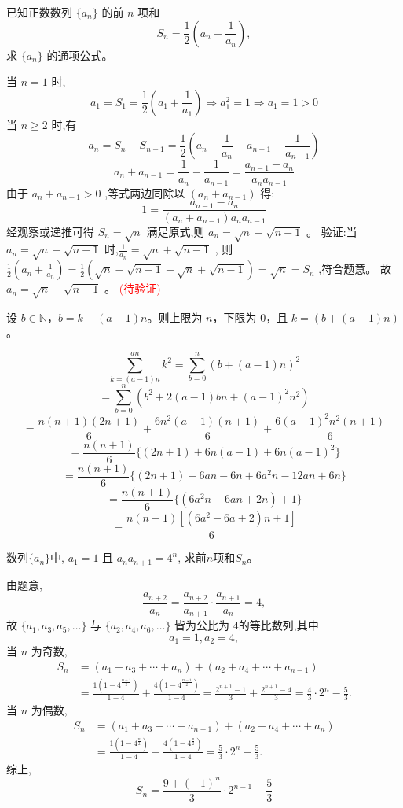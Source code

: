 \begin{questions}
\question 已知正数数列 $\{a_n\}$ 的前 $n$ 项和 
\[
S_n = \frac{1}{2} \left(a_n + \frac{1}{a_n}\right) ,
\]
求 $\{a_n\}$ 的通项公式。
\begin{solution}
当 $n=1$ 时,
\[
a_1 = S_1 = \frac{1}{2}\left(a_1 + \frac{1}{a_1}\right) \Rightarrow a_1^2 = 1 \Rightarrow a_1 = 1 >0
\]
当 $n \ge 2$ 时,有
\[ 
a_n = S_n - S_{n-1} = \frac{1}{2}\left(a_n + \frac{1}{a_n} - a_{n-1} - \frac{1}{a_{n-1}}\right) 
\]
\[ a_n + a_{n-1} = \frac{1}{a_n} - \frac{1}{a_{n-1}} = \frac{a_{n-1} - a_n}{a_n a_{n-1}} \]
由于 $a_n + a_{n-1} > 0$ ,等式两边同除以 $(a_n + a_{n-1})$ 得:
\[ 1 = \frac{a_{n-1} - a_n}{(a_n + a_{n-1}) a_n a_{n-1}} \]
经观察或递推可得 $S_n = \sqrt{n}$ 满足原式,则 $a_n = \sqrt{n} - \sqrt{n-1}$ 。
验证:当 $a_n = \sqrt{n} - \sqrt{n-1}$ 时,$\frac{1}{a_n} = \sqrt{n} + \sqrt{n-1}$ ,
则 $\frac{1}{2}(a_n + \frac{1}{a_n}) = \frac{1}{2}(\sqrt{n} - \sqrt{n-1} + \sqrt{n} + \sqrt{n-1}) = \sqrt{n} = S_n$ ,符合题意。
故 $a_n = \sqrt{n} - \sqrt{n-1}$ 。
\textcolor{red}{(待验证)}
\end{solution}

\question
设 $b \in \mathbb{N}$，$b = k - (a - 1)n$。则上限为 $n$，下限为 $0$，且 $k = (b + (a - 1)n)$。
\begin{solution}
\[ \sum_{k=(a-1)n}^{an} k^2 = \sum_{b=0}^{n} (b + (a - 1)n)^2 \]
\[ = \sum_{b=0}^{n} (b^2 + 2(a - 1)bn + (a - 1)^2 n^2) \]
\[ = \frac{n(n + 1)(2n + 1)}{6} + \frac{6n^2(a - 1)(n + 1)}{6} + \frac{6(a - 1)^2 n^2 (n + 1)}{6} \]
\[ = \frac{n(n + 1)}{6} \{ (2n + 1) + 6n(a - 1) + 6n(a - 1)^2 \} \]
\[ = \frac{n(n + 1)}{6} \{ (2n + 1) + 6an - 6n + 6a^2 n - 12an + 6n \} \]
\[ = \frac{n(n + 1)}{6} \{ (6a^2 n - 6an + 2n) + 1 \} \]
\[ = \frac{n(n + 1) [(6a^2 - 6a + 2)n + 1]}{6} \]
\end{solution}

    \question 数列$\{a_n\}$中, $a_1=1$ 且 $a_n a_{n+1}=4^n$, 求前$n$项和$S_n$。
    \begin{solution}
        由题意,
        \[
        \frac{a_{n+2}}{a_n} = \frac{a_{n+2}}{a_{n+1}} \cdot \frac{a_{n+1}}{a_{n}} = 4,
        \]
        故 $\{a_1,a_3,a_5,\dots\}$ 与 $\{a_2,a_4,a_6,\dots\}$ 皆为公比为 $4$的等比数列,其中 
        \[
        a_1=1,a_2=4,
        \]
        当 $n$ 为奇数,
        \begin{align*}
        S_n 
        &= (a_1+a_3+\cdots+a_n) + (a_2+a_4+\cdots+a_{n-1}) \\
        &= \frac{1(1-4^{\frac{n+1}{2}})}{1-4} + \frac{4(1-4^{\frac{n-1}{2}})}{1-4} = \frac{2^{n+1}-1}{3} + \frac{2^{n+1}-4}{3} = \frac{4}{3}\cdot 2^n - \frac{5}{3}.
        \end{align*}
        当 $n$ 为偶数,
        \begin{align*}
        S_n 
        &= (a_1+a_3+\cdots+a_{n-1}) + (a_2+a_4+\cdots+a_n) \\
        &= \frac{1(1-4^{\frac{n}{2}})}{1-4} + \frac{4(1-4^{\frac{n}{2}})}{1-4} = \frac{5}{3}\cdot 2^n - \frac{5}{3}.
        \end{align*}
        综上,
        \[
        S_n = \frac{9+(-1)^n}{3}\cdot 2^{n-1} - \frac{5}{3}
        \]
    \end{solution}


\end{questions}
